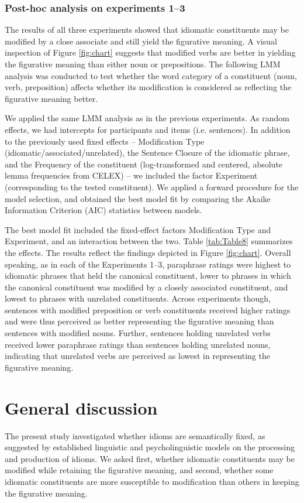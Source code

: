 \documentclass[output=paper]{langsci/langscibook}
\begin{document}
\subsubsection{Post-hoc analysis on experiments 1--3}    

The results of all three experiments showed that idiomatic constituents may be modified by a close associate and still yield the figurative meaning. A visual inspection of Figure \ref{fig:chart} suggests that modified verbs are better in yielding the figurative meaning than either noun or prepositions. The following LMM analysis was conducted to test whether the word category of a constituent (noun, verb, preposition) affects whether its modification is considered as reflecting the figurative meaning better. 

We applied the same LMM analysis as in the previous experiments. As random effects, we had intercepts for participants and items (i.e. sentences). In addition to the previously used fixed effects -- Modification Type (idiomatic\slash associated\slash unrelated), the Sentence Closure of the idiomatic phrase, and the Frequency of the constituent (log-transformed and centered, absolute lemma frequencies from CELEX) -- we included the factor Experiment (corresponding to the tested constituent).  We applied a forward procedure for the model selection, and obtained the best model fit by comparing the Akaike Information Criterion (AIC) statistics between models. 

The best model fit included the fixed-effect factors Modification Type and Experiment, and an interaction between the two.  Table \ref{tab:Table8} summarizes the effects. The results reflect the findings depicted in Figure \ref{fig:chart}.  Overall speaking, as in each of the Experiments 1--3, paraphrase ratings were highest to idiomatic phrases that held the canonical constituent, lower to phrases in which the canonical constituent was modified by a closely associated constituent, and lowest to phrases with unrelated constituents. Across experiments though, sentences with modified preposition or verb constituents received higher ratings and were thus perceived as better representing the figurative meaning than sentences with modified nouns. Further, sentences holding unrelated verbs received lower paraphrase ratings than sentences holding unrelated nouns, indicating that unrelated verbs are perceived as lowest in representing the figurative meaning. 

\section{General discussion}
The present study investigated whether idioms are semantically fixed, as suggested by established linguistic and psycholinguistic models on the processing and production of idioms. We asked first, whether idiomatic constituents may be modified while retaining the figurative meaning, and second, whether some idiomatic constituents are more susceptible to modification than others in keeping the figurative meaning. 
\end{document}
